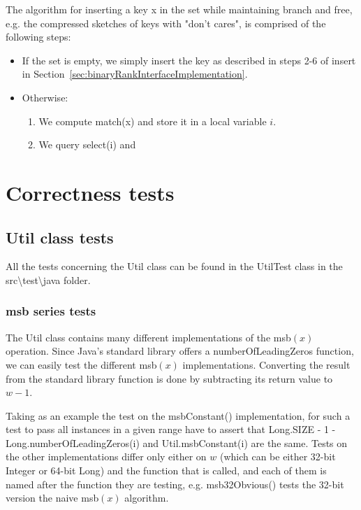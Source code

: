 The algorithm for inserting a key {\ttfamily x} in the set while maintaining {\ttfamily branch} and {\ttfamily free}, e.g. the compressed sketches of keys with "don't cares", is comprised of the following steps:
\begin{itemize}
    \item
    If the set is empty, we simply insert the key as described in steps 2-6 of {\ttfamily insert} in Section~\ref{sec:binaryRankInterfaceImplementation}.
    
    \item
    Otherwise:
    \begin{enumerate}
        \item
        We compute {\ttfamily match(x)} and store it in a local variable $i$.
        
        \item
        We query {\ttfamily select(i)} and 
        
    \end{enumerate}
\end{itemize}

\chapter{Correctness tests}

\section{{\ttfamily Util} class tests}

All the tests concerning the {\ttfamily Util} class can be found in the {\ttfamily UtilTest} class in the {\ttfamily src\textbackslash test\textbackslash java} folder.

\subsection{msb series tests}

The {\ttfamily Util} class contains many different implementations of the msb$(x)$ operation. Since Java's standard library offers a {\ttfamily numberOfLeadingZeros} function, we can easily test the different msb$(x)$ implementations. Converting the result from the standard library function is done by subtracting its return value to $w - 1$.

Taking as an example the test on the {\ttfamily msbConstant()} implementation, for such a test to pass all instances in a given range have to assert that {\ttfamily Long.SIZE - 1 - Long.numberOfLeadingZeros(i)} and {\ttfamily Util.msbConstant(i)} are the same. Tests on the other implementations differ only either on $w$ (which can be either 32-bit {\ttfamily Integer} or 64-bit {\ttfamily Long}) and the function that is called, and each of them is named after the function they are testing, e.g. {\ttfamily msb32Obvious()} tests the 32-bit version the naive msb$(x)$ algorithm.

